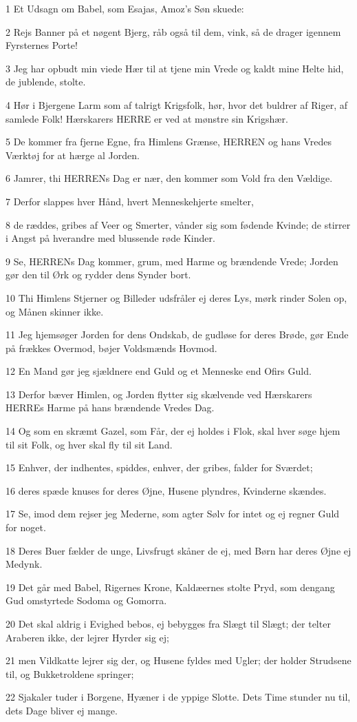 \par 1 Et Udsagn om Babel, som Esajas, Amoz's Søn skuede:
\par 2 Rejs Banner på et nøgent Bjerg, råb også til dem, vink, så de drager igennem Fyrsternes Porte!
\par 3 Jeg har opbudt min viede Hær til at tjene min Vrede og kaldt mine Helte hid, de jublende, stolte.
\par 4 Hør i Bjergene Larm som af talrigt Krigsfolk, hør, hvor det buldrer af Riger, af samlede Folk! Hærskarers HERRE er ved at mønstre sin Krigshær.
\par 5 De kommer fra fjerne Egne, fra Himlens Grænse, HERREN og hans Vredes Værktøj for at hærge al Jorden.
\par 6 Jamrer, thi HERRENs Dag er nær, den kommer som Vold fra den Vældige.
\par 7 Derfor slappes hver Hånd, hvert Menneskehjerte smelter,
\par 8 de ræddes, gribes af Veer og Smerter, vånder sig som fødende Kvinde; de stirrer i Angst på hverandre med blussende røde Kinder.
\par 9 Se, HERRENs Dag kommer, grum, med Harme og brændende Vrede; Jorden gør den til Ørk og rydder dens Synder bort.
\par 10 Thi Himlens Stjerner og Billeder udsfråler ej deres Lys, mørk rinder Solen op, og Månen skinner ikke.
\par 11 Jeg hjemsøger Jorden for dens Ondskab, de gudløse for deres Brøde, gør Ende på frækkes Overmod, bøjer Voldsmænds Hovmod.
\par 12 En Mand gør jeg sjældnere end Guld og et Menneske end Ofirs Guld.
\par 13 Derfor bæver Himlen, og Jorden flytter sig skælvende ved Hærskarers HERREs Harme på hans brændende Vredes Dag.
\par 14 Og som en skræmt Gazel, som Får, der ej holdes i Flok, skal hver søge hjem til sit Folk, og hver skal fly til sit Land.
\par 15 Enhver, der indhentes, spiddes, enhver, der gribes, falder for Sværdet;
\par 16 deres spæde knuses for deres Øjne, Husene plyndres, Kvinderne skændes.
\par 17 Se, imod dem rejser jeg Mederne, som agter Sølv for intet og ej regner Guld for noget.
\par 18 Deres Buer fælder de unge, Livsfrugt skåner de ej, med Børn har deres Øjne ej Medynk.
\par 19 Det går med Babel, Rigernes Krone, Kaldæernes stolte Pryd, som dengang Gud omstyrtede Sodoma og Gomorra.
\par 20 Det skal aldrig i Evighed bebos, ej bebygges fra Slægt til Slægt; der telter Araberen ikke, der lejrer Hyrder sig ej;
\par 21 men Vildkatte lejrer sig der, og Husene fyldes med Ugler; der holder Strudsene til, og Bukketroldene springer;
\par 22 Sjakaler tuder i Borgene, Hyæner i de yppige Slotte. Dets Time stunder nu til, dets Dage bliver ej mange.

